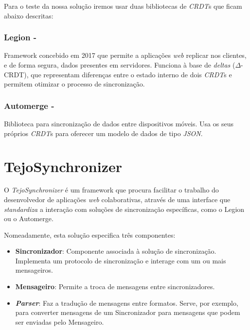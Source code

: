 \documentclass[runningheads]{llncs}
\begin{document}
        Para o teste da nossa solução iremos usar duas bibliotecas de {\itshape
        CRDT}s que ficam abaixo descritas:

        \subsubsection{Legion -} Framework concebido em 2017 que permite a
        aplicações {\itshape web} replicar nos clientes, e de forma segura,
        dados presentes em servidores. Funciona à base de {\itshape deltas}
        ($\Delta$-CRDT), que representam diferenças entre o estado interno de
        dois {\itshape CRDT}s e permitem otimizar o processo de sincronização.

        \subsubsection{Automerge -} Biblioteca para sincronização de dados entre
        dispositivos móveis. Usa os seus próprios {\itshape CRDT}s para oferecer
        um modelo de dados de tipo {\itshape JSON}.

    \section{TejoSynchronizer}

        O {\itshape TejoSynchronizer} é um framework que procura facilitar o
        trabalho do desenvolvedor de aplicações {\itshape web} colaborativas, através de uma interface que
        {\itshape standardiza} a interação com soluções de sincronização
        específicas, como o Legion ou o Automerge.
        
        Nomeadamente, esta solução especifica três componentes:

        \begin{itemize}
            \item \textbf{Sincronizador}: Componente associada à solução de
            sincronização. Implementa um protocolo de sincronização e interage
            com um ou mais mensageiros.
            \item \textbf{Mensageiro}: Permite a troca de mensagens entre
            sincronizadores. 
            \item \textbf{\itshape Parser}: Faz a tradução de mensagens entre
            formatos. Serve, por exemplo, para converter mensagens de um
            Sincronizador para mensagens que podem ser enviadas pelo Mensageiro.
        \end{itemize}
        
\end{document}
